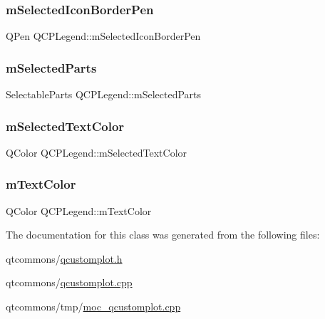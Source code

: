 \mbox{\label{class_q_c_p_legend_a7429ac0e64c7b90b649b4d8f4cc5fa55}} 
\subsubsection{\texorpdfstring{mSelectedIconBorderPen}{mSelectedIconBorderPen}}
{\footnotesize\ttfamily Q\+Pen Q\+C\+P\+Legend\+::m\+Selected\+Icon\+Border\+Pen\hspace{0.3cm}{\ttfamily [protected]}}

\mbox{\label{class_q_c_p_legend_a917a34dd2856baafd8d56852d94d00e2}} 
\subsubsection{\texorpdfstring{mSelectedParts}{mSelectedParts}}
{\footnotesize\ttfamily Selectable\+Parts Q\+C\+P\+Legend\+::m\+Selected\+Parts\hspace{0.3cm}{\ttfamily [protected]}}

\mbox{\label{class_q_c_p_legend_a6c25c8796c6e73e983aae6024965f2be}} 
\subsubsection{\texorpdfstring{mSelectedTextColor}{mSelectedTextColor}}
{\footnotesize\ttfamily Q\+Color Q\+C\+P\+Legend\+::m\+Selected\+Text\+Color\hspace{0.3cm}{\ttfamily [protected]}}

\mbox{\label{class_q_c_p_legend_a478b2d809a7390e9ff8f8bb70d6bd9fe}} 
\subsubsection{\texorpdfstring{mTextColor}{mTextColor}}
{\footnotesize\ttfamily Q\+Color Q\+C\+P\+Legend\+::m\+Text\+Color\hspace{0.3cm}{\ttfamily [protected]}}



The documentation for this class was generated from the following files\+:\begin{DoxyCompactItemize}
\item 
qtcommons/\mbox{\hyperlink{qcustomplot_8h}{qcustomplot.\+h}}\item 
qtcommons/\mbox{\hyperlink{qcustomplot_8cpp}{qcustomplot.\+cpp}}\item 
qtcommons/tmp/\mbox{\hyperlink{moc__qcustomplot_8cpp}{moc\+\_\+qcustomplot.\+cpp}}\end{DoxyCompactItemize}
